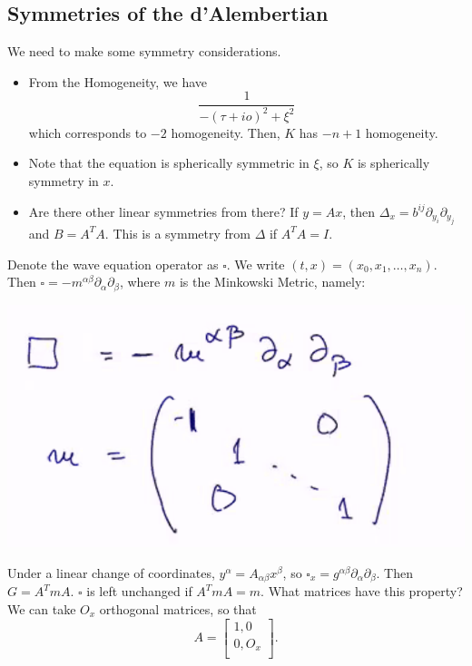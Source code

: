 \documentclass[11pt]{scrartcl}
\begin{document}
\subsection{Symmetries of the d'Alembertian}
We need to make some symmetry considerations.  
\begin{itemize}
\item From the Homogeneity, we have 
$$\frac{1}{-(\tau + io)^2 + \xi^2}$$
which corresponds to $-2$ homogeneity.  Then, $K$ has $-n+1$ homogeneity.
\item Note that the equation is spherically symmetric in $\xi$, so $K$ is spherically symmetry in $x$.
\item Are there other linear symmetries from there?  If $y = Ax$,  then $\Delta_x = b^{ij} \partial_{y_i} \partial_{y_j}$ and $B = A^TA$.  This is a symmetry from $\Delta$ if $A^TA = I$.  
\end{itemize}
Denote the wave equation operator as $\square$.  We write $(t, x) = (x_0, x_1, \dots, x_n)$.  Then $\square = -m^{\alpha \beta}\partial_\alpha \partial_\beta$, where $m$ is the Minkowski Metric, namely:
\begin{center}
\includegraphics[scale=0.6]{minkowski.png}
\end{center}
Under a linear change of coordinates, $y^\alpha = A_{\alpha \beta}x^{\beta}$, so $\square_x = g^{\alpha \beta}\partial_\alpha \partial_\beta$.  Then $G = A^TmA$.  $\square$ is left unchanged if $A^TmA = m$.  What matrices have this property? 
We can take $O_x$ orthogonal matrices, so that $$A = \begin{bmatrix}
1 , 0\\ 
0, O_x \\
\end{bmatrix}.$$
\end{document}
